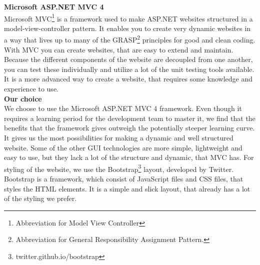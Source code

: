 \documentclass[a4paper,11pt,report]{article}
\begin{document}
\textbf{Microsoft ASP.NET MVC 4} \\
Microsoft MVC\footnote{Abbreviation for Model View Controller} is a framework used to make ASP.NET websites structured in a model-view-controller pattern. It enables you to create very dynamic websites in a way that lives up to many of the GRASP\footnote{Abbreviation for General Responsibility Assignment Pattern.} principles for good and clean coding. With MVC you can create websites, that are easy to extend and maintain. Because the different components of the website are decoupled from one another, you can test these individually and utilize a lot of the unit testing tools available. It is a more advanced way to create a website, that requires some knowledge and experience to use. \\

\textbf{Our choice} \\
We choose to use the Microsoft ASP.NET MVC 4 framework. Even though it requires a learning period for the development team to master it, we find that the benefits that the framework gives outweigh the potentially steeper learning curve. It gives us the most possibilities for making a dynamic and well structured website. Some of the other GUI technologies are more simple, lightweight and easy to use, but they lack a lot of the structure and dynamic, that MVC has. For styling of the website, we use the Bootstrap\footnote{twitter.github.io/bootstrap} layout, developed by Twitter. Bootstrap is a framework, which consist of JavaScript files and CSS files, that styles the HTML elements. It is a simple and slick layout, that already has a lot of the styling we prefer.
\end{document}
